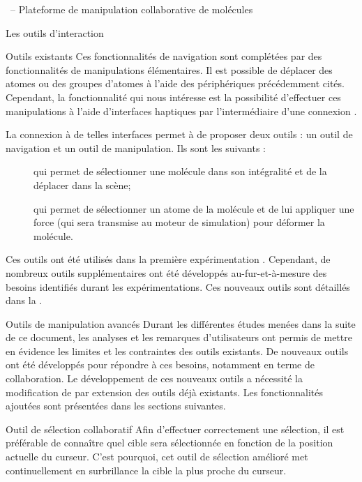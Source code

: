 \documentclass[myfrancais,ngerman,english,french]{mythesis}
\begin{document}
\begin{mychapter}{\myShaddock\ -- Plateforme de manipulation collaborative de molécules}
\begin{mysection}{Les outils d'interaction}
\begin{mysubsection}{Outils existants}
				Ces fonctionnalités de navigation sont complétées par des fonctionnalités de manipulations élémentaires.
				Il est possible de déplacer des atomes ou des groupes d'atomes à l'aide des périphériques précédemment cités.
				Cependant, la fonctionnalité qui nous intéresse est la possibilité d'effectuer ces manipulations à l'aide d'interfaces haptiques par l'intermédiaire d'une connexion  .

				La connexion à de telles interfaces permet à  de proposer deux outils : un outil de navigation et un outil de manipulation.
				Ils sont les suivants :
				\begin{description}
					\item[] qui permet de sélectionner une molécule dans son intégralité et de la déplacer dans la scène;
					\item[] qui permet de sélectionner un atome de la molécule et de lui appliquer une force (qui sera transmise au moteur de simulation) pour déformer la molécule.
				\end{description}
				Ces outils ont été utilisés dans la première expérimentation .
				Cependant, de nombreux outils supplémentaires ont été développés au-fur-et-à-mesure des besoins identifiés durant les expérimentations.
				Ces nouveaux outils sont détaillés dans la .
			\end{mysubsection}
			\begin{mysubsection}{Outils de manipulation avancés}
				Durant les différentes études menées dans la suite de ce document, les analyses et les remarques d'utilisateurs ont permis de mettre en évidence les limites et les contraintes des outils existants.
				De nouveaux outils ont été développés pour répondre à ces besoins, notamment en terme de collaboration.
				Le développement de ces nouveaux outils a nécessité la modification de  par extension des outils déjà existants.
				Les fonctionnalités ajoutées sont présentées dans les sections suivantes.
				\begin{mysubsubsection}{Outil de sélection collaboratif}
					Afin d'effectuer correctement une sélection, il est préférable de connaître \myapriori quel cible sera sélectionnée en fonction de la position actuelle du curseur.
					C'est pourquoi, cet outil de sélection amélioré met continuellement en surbrillance la cible la plus proche du curseur.

\end{mysubsubsection}
\end{mysubsection}
\end{mysection}
\end{mychapter}
\end{document}
